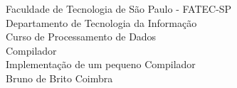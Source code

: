 \thispagestyle{empty}
\begin{center}
\large Faculdade de Tecnologia de São Paulo - FATEC-SP \\
\large Departamento de Tecnologia da Informação \\
\large Curso de Processamento de Dados \\
\vspace{8cm}
\huge Compilador \\ \Large Implementação de um pequeno Compilador  \\
\vspace{9cm}
\large Bruno de Brito Coimbra
\end{center}
